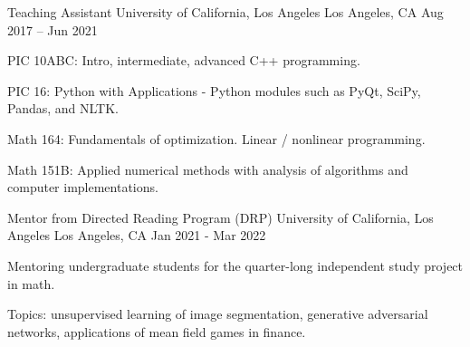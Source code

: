 \begin{cventries}
  \cventry
    {Teaching Assistant} %
    {University of California, Los Angeles} %
    {Los Angeles, CA} %
    {Aug 2017 – Jun 2021} %
    {
      \begin{cvitems} %
        \item {PIC 10ABC: Intro, intermediate, advanced C++ programming.}
        \item {PIC 16: Python with Applications} - Python modules such as PyQt, SciPy, Pandas, and NLTK.
        \item {Math 164: Fundamentals of optimization. Linear / nonlinear programming}.
        \item {Math 151B: Applied numerical methods with analysis of algorithms and computer implementations}.
      \end{cvitems}
    }

  \cventry
    {Mentor from Directed Reading Program (DRP)} %
    {University of California, Los Angeles} %
    {Los Angeles, CA} %
    {Jan 2021 - Mar 2022} %
    {
      \begin{cvitems} %
        \item Mentoring undergraduate students for the quarter-long independent study project in math.
        \item Topics: unsupervised learning of image segmentation, generative adversarial networks, applications of mean field games in finance.
      \end{cvitems}
    }

\end{cventries}
